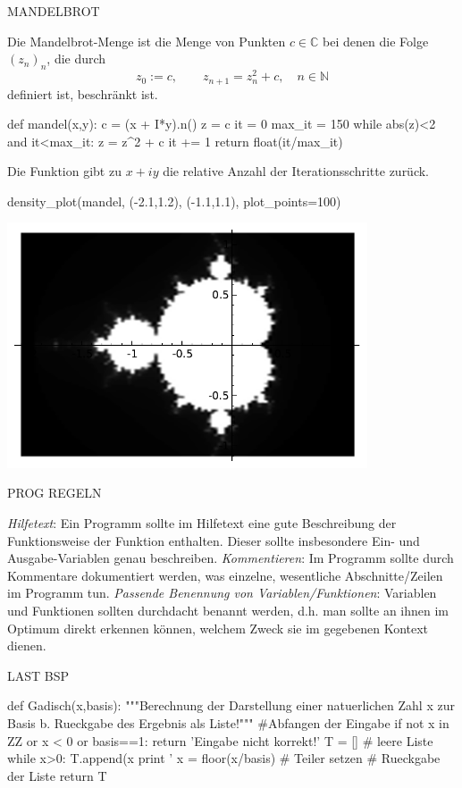 \documentclass[fontsize=12pt,paper=a4,twoside,bibtotoc,idxtotoc,
liststotoc,pagesize,BCOR1.2cm,DIV15,chapterprefix,pagesize=pdftex]{scrbook}
\theoremstyle{plain}
\theoremstyle{definition}
\theoremstyle{remark}
\begin{document}
MANDELBROT

Die Mandelbrot-Menge ist die Menge von Punkten $c \in \mathbb{C}$
bei denen die Folge $(z_n)_n$, die durch
\[ z_0:=c, \qquad  z_{n+1} = z_n^2 +c, \quad n \in \mathbb{N}\]
definiert ist, beschränkt ist.

\begin{sagein}
def mandel(x,y):
    c = (x + I*y).n()
    z = c
    it = 0
    max_it = 150
    while abs(z)<2 and it<max_it:
        z = z^2 + c
        it += 1
    return float(it/max_it)
\end{sagein}
Die Funktion  gibt zu $x+iy$ die relative Anzahl der
Iterationsschritte zurück.

\begin{sagein}
density_plot(mandel, (-2.1,1.2), (-1.1,1.1), plot_points=100)
\end{sagein}
\begin{center}
\includegraphics[width=0.8\textwidth]{mandel.pdf} 
\end{center}

PROG REGELN


 \emph{Hilfetext}: Ein Programm sollte im Hilfetext eine gute Beschreibung der Funktionsweise der Funktion enthalten. Dieser sollte insbesondere Ein- und Ausgabe-Variablen genau beschreiben.
 \emph{Kommentieren}: Im Programm sollte durch Kommentare dokumentiert werden, was einzelne, wesentliche Abschnitte/Zeilen im Programm tun.
 \emph{Passende Benennung von Variablen/Funktionen}: Variablen und Funktionen sollten durchdacht benannt werden, d.h. man sollte an ihnen im Optimum direkt erkennen können, welchem Zweck sie im gegebenen Kontext dienen. 


LAST BSP

\begin{sagein}
def Gadisch(x,basis):
    """Berechnung der Darstellung einer natuerlichen Zahl 
x zur Basis b. Rueckgabe des Ergebnis als Liste!"""
    #Abfangen der Eingabe
    if not x in ZZ or x < 0 or basis==1: 
        return 'Eingabe nicht korrekt!'
    T = []  # leere Liste 
    while x>0:
        T.append(x%
        print '%
        x = floor(x/basis) # Teiler setzen
    # Rueckgabe der Liste
    return T
\end{sagein}
\end{document}
